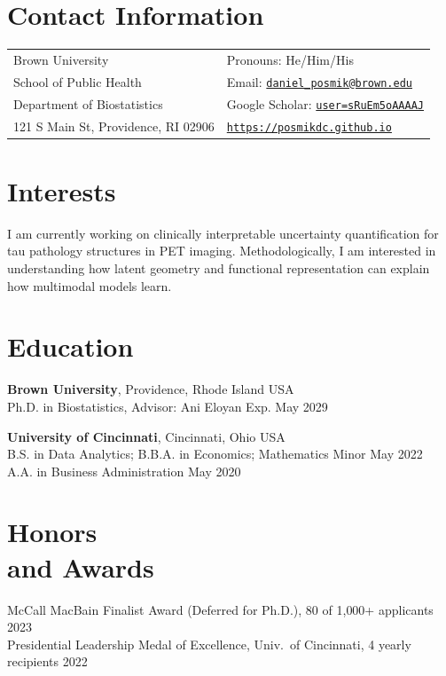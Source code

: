 \documentclass[margin,line]{res}
\begin{document}

\begin{resume}

\section{\sc Contact Information}
\vspace{.05in}
\begin{tabular}{@{}p{3in}p{4in}}
Brown University & {Pronouns: He/Him/His} \\
School of Public Health& {Email:} \href{mailto:daniel_posmik@brown.edu}{\texttt{daniel\_posmik@brown.edu}} \\
Department of Biostatistics & {Google Scholar:} \href{https://scholar.google.com/citations?user=sRuEm5oAAAAJ}{\texttt{user=sRuEm5oAAAAJ}} \\
121 S Main St, Providence, RI 02906 & \href{https://posmikdc.github.io}{\texttt{https://posmikdc.github.io}} \\
\end{tabular}

\section{\sc Interests}
I am currently working on clinically interpretable uncertainty quantification for tau pathology structures in PET imaging. Methodologically, I am interested in understanding how latent geometry and functional representation can explain how multimodal models learn.

\section{\sc Education}
\textbf{Brown University}, Providence, Rhode Island USA \\
Ph.D. in Biostatistics, Advisor: Ani Eloyan \hfill Exp. May 2029 

\textbf{University of Cincinnati}, Cincinnati, Ohio USA \\
B.S. in Data Analytics; B.B.A. in Economics; Mathematics Minor \hfill May 2022 \\
A.A. in Business Administration \hfill May 2020

\section{\sc Honors \\ and Awards}
McCall MacBain Finalist Award (Deferred for Ph.D.), 80 of 1{,}000+ applicants \hfill 2023 \\
Presidential Leadership Medal of Excellence, Univ.\ of Cincinnati, 4 yearly recipients \hfill 2022


\end{resume}
\end{document}
